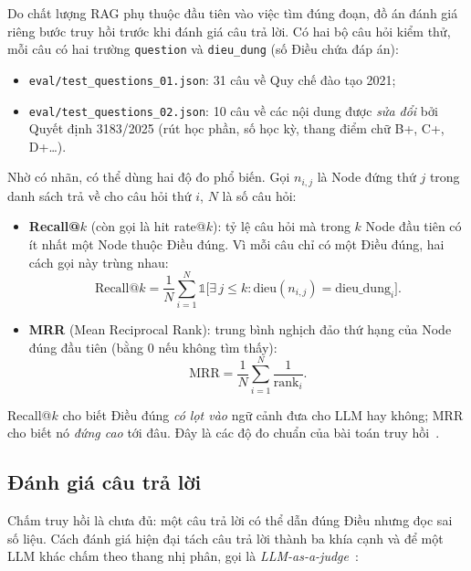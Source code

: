 Do chất lượng RAG phụ thuộc đầu tiên vào việc tìm đúng đoạn, đồ án đánh giá riêng bước truy hồi trước khi đánh giá câu trả lời. Có hai bộ câu hỏi kiểm thử, mỗi câu có hai trường \texttt{question} và \texttt{dieu\_dung} (số Điều chứa đáp án):

\begin{itemize}
  \item \texttt{eval/test\_questions\_01.json}: 31 câu về Quy chế đào tạo 2021;
  \item \texttt{eval/test\_questions\_02.json}: 10 câu về các nội dung được \emph{sửa đổi} bởi Quyết định 3183/2025 (rút học phần, số học kỳ, thang điểm chữ B+, C+, D+\ldots).
\end{itemize}

Nhờ có nhãn, có thể dùng hai độ đo phổ biến. Gọi $n_{i,j}$ là Node đứng thứ $j$ trong danh sách trả về cho câu hỏi thứ $i$, $N$ là số câu hỏi:

\begin{itemize}
  \item \textbf{Recall@$k$} (còn gọi là hit rate@$k$): tỷ lệ câu hỏi mà trong $k$ Node đầu tiên có ít nhất một Node thuộc Điều đúng. Vì mỗi câu chỉ có một Điều đúng, hai cách gọi này trùng nhau:
  \begin{equation}
    \text{Recall@}k = \frac{1}{N}\sum_{i=1}^{N} \mathbb{1}\big[\exists\, j \le k : \text{dieu}(n_{i,j}) = \text{dieu\_dung}_i\big].
  \end{equation}
  \item \textbf{MRR} (Mean Reciprocal Rank): trung bình nghịch đảo thứ hạng của Node đúng đầu tiên (bằng 0 nếu không tìm thấy):
  \begin{equation}
    \text{MRR} = \frac{1}{N}\sum_{i=1}^{N} \frac{1}{\text{rank}_i}.
  \end{equation}
\end{itemize}

Recall@$k$ cho biết Điều đúng \emph{có lọt vào} ngữ cảnh đưa cho LLM hay không; MRR cho biết nó \emph{đứng cao} tới đâu. Đây là các độ đo chuẩn của bài toán truy hồi~\cite{thakur2021beir}.

\subsection{Đánh giá câu trả lời}

Chấm truy hồi là chưa đủ: một câu trả lời có thể dẫn đúng Điều nhưng đọc sai số liệu. Cách đánh giá hiện đại tách câu trả lời thành ba khía cạnh và để một LLM khác chấm theo thang nhị phân, gọi là \emph{LLM-as-a-judge}~\cite{zheng2023judging}:

